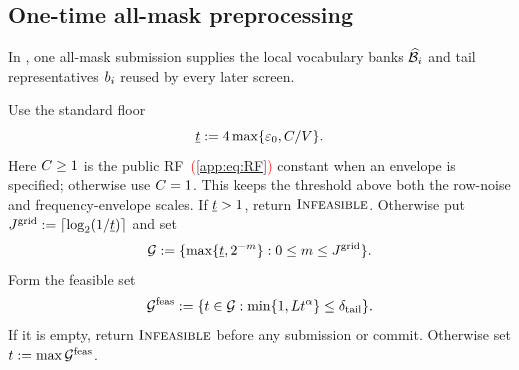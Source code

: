 \subsection{One-time all-mask preprocessing}
\label{app:algorithm-preprocessing}

In , one all-mask submission supplies the
local vocabulary banks $\widehat{\mathcal B}_{i}$ and tail representatives
$b_{i}$ reused by every later screen.

\begin{definition}
\label{app:def:preprocessing}
Use the standard floor
\begin{equation}
 \underline t:=4\max\{\varepsilon_0,C/V\}.
 \label{app:eq:rate-threshold-floor}
\end{equation}
Here $C\ge1$ is the public RF\textcolor{red}{~(\cref{app:eq:RF})} constant when an envelope is
specified; otherwise use $C=1$.
This keeps the threshold above both the row-noise and
frequency-envelope scales.
If $\underline t>1$, return $\textsc{Infeasible}$.
Otherwise put
$J^{\mathrm{grid}}:=\lceil\log_2(1/\underline t)\rceil$ and set
\begin{equation}
 \mathcal G
 :=\{\max\{\underline t,2^{-m}\}:0\le m\le J^{\mathrm{grid}}\}.
 \label{app:eq:threshold-grid}
\end{equation}
Form the feasible set
\begin{equation}
 \mathcal G^{\mathrm{feas}}
 :=\{t\in\mathcal G:
       \min\{1,L t^{\alpha}\}\le\delta_{\mathrm{tail}}\}.
 \label{app:eq:feasible-threshold-grid}
\end{equation}
If it is empty, return $\textsc{Infeasible}$ before any submission or commit.
Otherwise set $t:=\max\mathcal G^{\mathrm{feas}}$.


\end{definition}
